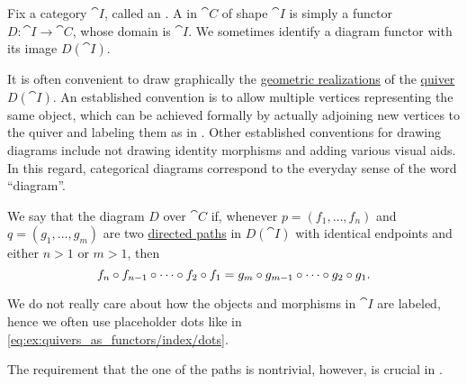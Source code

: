 \begin{definition}\label{def:categorical_diagram}
  Fix a category \( \cat{I} \), called an . A  in \( \cat{C} \) of shape \( \cat{I} \) is simply a functor \( D: \cat{I} \to \cat{C} \), whose domain is \( \cat{I} \). We sometimes identify a diagram functor with its image \( D(\cat{I}) \).

  It is often convenient to draw graphically the \hyperref[def:quiver_geometric_realization]{geometric realizations} of the \hyperref[def:quiver]{quiver} \( D(\cat{I}) \). An established convention is to allow multiple vertices representing the same object, which can be achieved formally by actually adjoining new vertices to the quiver and labeling them as in . Other established conventions for drawing diagrams include not drawing identity morphisms and adding various visual aids. In this regard, categorical diagrams correspond to the everyday sense of the word \enquote{diagram}.

  We say that the diagram \( D \) over \( \cat{C} \)  if, whenever \( p = (f_1, \ldots, f_n) \) and \( q = (g_1, \ldots, g_m) \) are two \hyperref[def:quiver_path/directed]{directed paths} in \( D(\cat{I}) \) with identical endpoints and either \( n > 1 \) or \( m > 1 \), then
  \begin{equation*}
    f_n \bincirc f_{n-1} \bincirc \cdots \bincirc f_2 \bincirc f_1
    =
    g_m \bincirc g_{m-1} \bincirc \cdots \bincirc g_2 \bincirc g_1.
  \end{equation*}

  We do not really care about how the objects and morphisms in \( \cat{I} \) are labeled, hence we often use placeholder dots like in \eqref{eq:ex:quivers_as_functors/index/dots}.

  The requirement that the one of the paths is nontrivial, however, is crucial in .
\end{definition}

